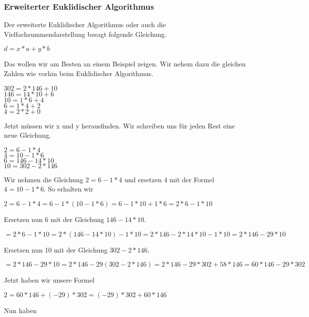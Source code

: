\subsubsection{Erweiterter Euklidischer Algorithmus}
Der erweiterte Euklidischer Algorithmus oder auch die Vielfachsummendarstellung besagt folgende Gleichung.
\begin{center}
$ d = x * a + y * b $
\end{center}
Das wollen wir am Besten an einem Beispiel zeigen. Wir nehem dazu die gleichen Zahlen wie vorhin beim Euklidischer Algorithmus.
\begin{center}
$ 302 = 2 * 146 + 10 $\\
$ 146 = 14 * 10 + 6 $ \\
$ 10 = 1 * 6 + 4 $ \\
$ 6 = 1 * 4 + 2 $ \\
$ 4 = 2 * 2 + 0 $\\
\end{center}
Jetzt müssen wir x und y herausfinden.
Wir schreiben uns für jeden Rest eine neue Gleichung.
\begin{center}
$ 2 = 6 - 1 * 4 $ \\
$ 4 = 10 - 1 * 6 $ \\
$ 6 = 146 - 14 * 10 $\\
$ 10 = 302 - 2 * 146 $\\
\end{center}
Wir nehmen die Gleichung $ 2 = 6 - 1 * 4 $ und ersetzen 4 mit der Formel $ 4 = 10 - 1 * 6 $. So erhalten wir\\
\begin{center}
$ 2 = 6 - 1 * 4  =  6 - 1 * (10 - 1 * 6) =  6 - 1 * 10 + 1 * 6 = 2 * 6 - 1 * 10 $\\
\end{center}
Ersetzen nun 6 mit der Gleichung $146 - 14 * 10$.
\begin{center}
$   = 2 * 6 - 1 * 10  = 2 * (146 - 14 * 10) - 1 * 10 = 2*146 -2*14*10 - 1*10 = 2*146 - 29*10   $\\
\end{center}
Ersetzen nun 10 mit der Gleichung $ 302 - 2 * 146 $.
\begin{center}
$   = 2*146 - 29*10 = 2 * 146 - 29 (302 - 2 * 146) = 2 * 146 - 29 * 302 + 58 * 146 = 60 * 146 - 29 * 302 $\\
\end{center}
Jetzt haben wir unsere Formel
\begin{center}
$ 2 = 60 * 146 + (-29) * 302 = (-29) * 302 + 60 * 146 $ 
\end{center}
%
Nun haben 
